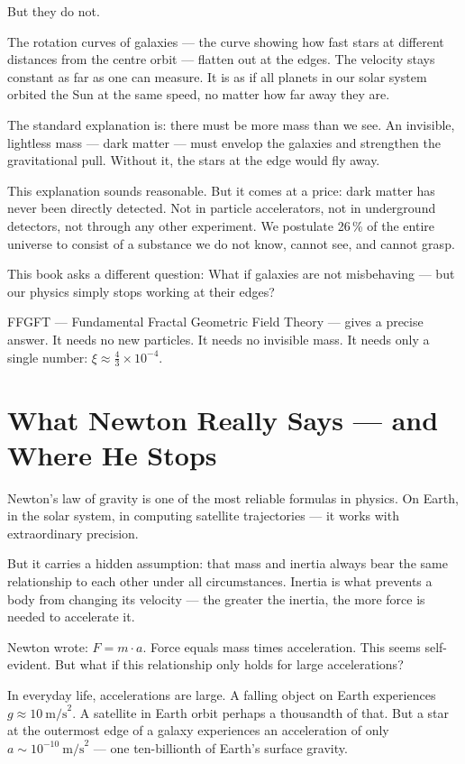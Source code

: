\documentclass[11pt,oneside]{book}
\begin{document}
But they do not.

The rotation curves of galaxies — the curve showing how fast
stars at different distances from the centre orbit — flatten
out at the edges. The velocity stays constant as far as one
can measure. It is as if all planets in our solar system
orbited the Sun at the same speed, no matter how far away
they are.

The standard explanation is: there must be more mass than we
see. An invisible, lightless mass — dark matter — must
envelop the galaxies and strengthen the gravitational pull.
Without it, the stars at the edge would fly away.

This explanation sounds reasonable. But it comes at a price:
dark matter has never been directly detected. Not in particle
accelerators, not in underground detectors, not through any
other experiment. We postulate 26\,\% of the entire universe
to consist of a substance we do not know, cannot see, and
cannot grasp.

This book asks a different question: What if galaxies are
not misbehaving — but our physics simply stops working at
their edges?

FFGFT — Fundamental Fractal Geometric Field Theory — gives
a precise answer. It needs no new particles. It needs no
invisible mass. It needs only a single number:
$\xi \approx \tfrac{4}{3} \times 10^{-4}$.

\chapter{What Newton Really Says — and Where He Stops}

Newton's law of gravity is one of the most reliable formulas
in physics. On Earth, in the solar system, in computing
satellite trajectories — it works with extraordinary
precision.

But it carries a hidden assumption: that mass and inertia
always bear the same relationship to each other under all
circumstances. Inertia is what prevents a body from changing
its velocity — the greater the inertia, the more force is
needed to accelerate it.

Newton wrote: $F = m \cdot a$. Force equals mass times
acceleration. This seems self-evident. But what if this
relationship only holds for large accelerations?

In everyday life, accelerations are large. A falling object
on Earth experiences $g \approx 10~\text{m/s}^2$. A
satellite in Earth orbit perhaps a thousandth of that. But
a star at the outermost edge of a galaxy experiences an
acceleration of only $a \sim 10^{-10}~\text{m/s}^2$ —
one ten-billionth of Earth's surface gravity.
\end{document}
